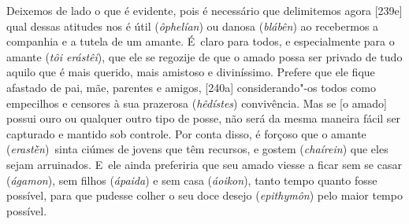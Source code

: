 Deixemos de lado o que é evidente, pois é necessário que delimitemos
agora [239e] qual dessas atitudes nos é útil (\emph{ôphelían}) ou
danosa (\emph{blábên}) ao recebermos a companhia e a tutela de um
amante. É~claro para todos, e especialmente para o amante (\emph{tôi
erástêi}), que ele se regozije de que o amado possa ser privado de tudo
aquilo que é mais querido, mais amistoso e diviníssimo. Prefere que ele
fique afastado de pai, mãe, parentes e amigos, [240a]
considerando"-os todos como empecilhos e censores à sua prazerosa
(\emph{hêdístes}) convivência. Mas se [o amado] possui ouro ou
qualquer outro tipo de posse, não será da mesma maneira fácil ser
capturado e mantido sob controle. Por conta disso, é forçoso que o
amante (\emph{erastḕn})\emph{~}sinta ciúmes de jovens que têm recursos,
e gostem (\emph{chaírein}) que eles sejam arruinados. E~ele ainda
preferiria que seu amado viesse a ficar sem se casar (\emph{ágamon}),
sem filhos (\emph{ápaida}) e sem casa (\emph{áoikon}), tanto tempo
quanto fosse possível, para que pudesse colher o seu doce desejo
(\emph{epithymôn}) pelo maior tempo possível.

 
 

